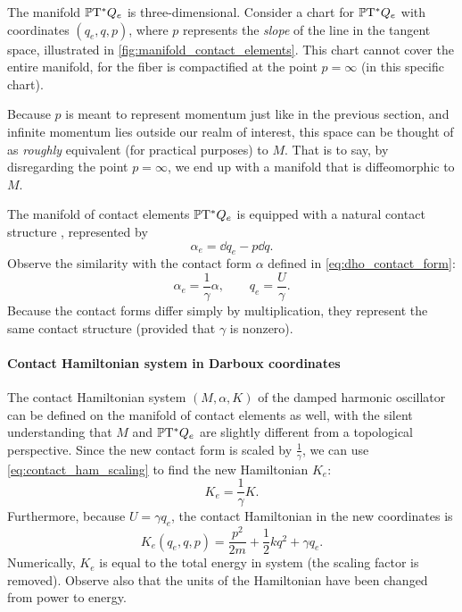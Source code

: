 The manifold \(\mathbb{P}\mathrm{T}^* Q_e\) is three-dimensional. Consider a chart for \(\mathbb{P}\mathrm{T}^* Q_e\) with coordinates \( (q_e, q, p) \),
where \(p\) represents the \emph{slope} of the line in the tangent space, illustrated in \cref{fig:manifold_contact_elements}. This chart cannot cover the entire manifold, for the fiber is compactified at the point \(p = \infty\) (in this specific chart). 

Because \(p\) is meant to represent momentum just like in the previous section, and infinite momentum lies outside our realm of interest, this space can be thought of as \emph{roughly} equivalent (for practical purposes) to \(M\). That is to say, by disregarding the point \(p = \infty\), we end up with a manifold that is diffeomorphic to \(M\).

The manifold of contact elements \(\mathbb{P}\mathrm{T}^* Q_e\) is equipped with a natural contact structure \cite{Arnold1989}, represented by
\begin{equation}
    \alpha_e = \dd{q}_e - p\dd{q}.
\end{equation}
Observe the similarity with the contact form \(\alpha\) defined in \cref{eq:dho_contact_form}: 
\begin{equation}
     \alpha_e = \frac{1}{\gamma}\alpha, \qquad q_e = \frac{U}{\gamma}.
\end{equation}
Because the contact forms differ simply by multiplication, they represent the same contact structure (provided that \(\gamma\) is nonzero).

\paragraph{Contact Hamiltonian system in Darboux coordinates} The contact Hamiltonian system \((M, \alpha, K)\) of the damped harmonic oscillator can be defined on the manifold of contact elements as well, with the silent understanding that \(M\) and \(\mathbb{P}\mathrm{T}^* Q_e\) are slightly different from a topological perspective. Since the new contact form is scaled by \(\tfrac{1}{\gamma}\), we can use \cref{eq:contact_ham_scaling} to find the new Hamiltonian \(K_e\):
\begin{equation}
     K_e = \frac{1}{\gamma} K.
\end{equation}
Furthermore, because \(U = \gamma q_e\), the contact Hamiltonian in the new coordinates is
\begin{equation}
    K_e(q_e, q, p) = \frac{p^2}{2m} + \frac{1}{2}kq^2 + \gamma q_e.
    \label{eq:dho_contact_hamiltonian_e}
\end{equation}
Numerically, \(K_e\) is equal to the total energy in system (the scaling factor is removed). Observe also that the units of the Hamiltonian have been changed from power to energy.

